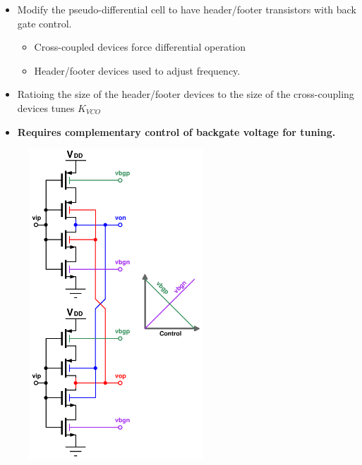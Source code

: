 			\begin{itemize}[itemsep=4pt,label=\protect---]
				\item Modify the pseudo-differential cell to have header/footer transistors with back gate control.
				\begin{itemize}[itemsep=4pt,label=$\bullet$]
					\item Cross-coupled devices force differential operation
					\item Header/footer devices used to adjust frequency.
				\end{itemize}				
				\item Ratioing the size of the header/footer devices to the size of the cross-coupling devices tunes $K_{VCO}$
				\item \textbf{Requires complementary control of backgate voltage for tuning.}
			\end{itemize}

			\begin{figure}[htb!]
			        \centering
			        \includegraphics[width=0.58\textwidth, angle=0]{./figs/tele_delay_cell}
			\end{figure}


